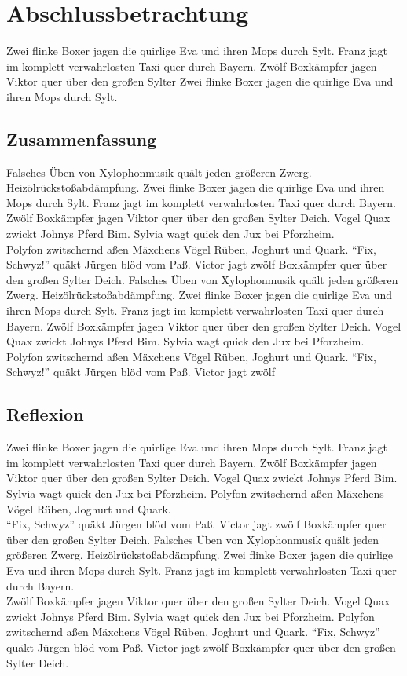 \section{Abschlussbetrachtung}

Zwei flinke Boxer jagen die quirlige Eva und ihren Mops durch Sylt. Franz jagt im komplett verwahrlosten Taxi quer durch Bayern. Zwölf Boxkämpfer jagen Viktor quer über den großen Sylter Zwei flinke Boxer jagen die quirlige Eva und ihren Mops durch Sylt.

\subsection{Zusammenfassung}

Falsches Üben von Xylophonmusik quält jeden größeren Zwerg. Heizölrückstoßabdämpfung. Zwei flinke Boxer jagen die quirlige Eva und ihren Mops durch Sylt. Franz jagt im komplett verwahrlosten Taxi quer durch Bayern. Zwölf Boxkämpfer jagen Viktor quer über den großen Sylter Deich. Vogel Quax zwickt Johnys Pferd Bim. Sylvia wagt quick den Jux bei Pforzheim.\\
Polyfon zwitschernd aßen Mäxchens Vögel Rüben, Joghurt und Quark. "`Fix, Schwyz!"' quäkt Jürgen blöd vom Paß. Victor jagt zwölf Boxkämpfer quer über den großen Sylter Deich. Falsches Üben von Xylophonmusik quält jeden größeren Zwerg. Heizölrückstoßabdämpfung. Zwei flinke Boxer jagen die quirlige Eva und ihren Mops durch Sylt. Franz jagt im komplett verwahrlosten Taxi quer durch Bayern. Zwölf Boxkämpfer jagen Viktor quer über den großen Sylter Deich. Vogel Quax zwickt Johnys Pferd Bim. Sylvia wagt quick den Jux bei Pforzheim. Polyfon zwitschernd aßen Mäxchens Vögel Rüben, Joghurt und Quark. "`Fix, Schwyz!"' quäkt Jürgen blöd vom Paß. Victor jagt zwölf\\

\subsection{Reflexion}

Zwei flinke Boxer jagen die quirlige Eva und ihren Mops durch Sylt. Franz jagt im komplett verwahrlosten Taxi quer durch Bayern. Zwölf Boxkämpfer jagen Viktor quer über den großen Sylter Deich. Vogel Quax zwickt Johnys Pferd Bim. Sylvia wagt quick den Jux bei Pforzheim. Polyfon zwitschernd aßen Mäxchens Vögel Rüben, Joghurt und Quark.\\
"`Fix, Schwyz"' quäkt Jürgen blöd vom Paß. Victor jagt zwölf Boxkämpfer quer über den großen Sylter Deich. Falsches Üben von Xylophonmusik quält jeden größeren Zwerg. Heizölrückstoßabdämpfung. Zwei flinke Boxer jagen die quirlige Eva und ihren Mops durch Sylt. Franz jagt im komplett verwahrlosten Taxi quer durch Bayern.\\
Zwölf Boxkämpfer jagen Viktor quer über den großen Sylter Deich. Vogel Quax zwickt Johnys Pferd Bim. Sylvia wagt quick den Jux bei Pforzheim. Polyfon zwitschernd aßen Mäxchens Vögel Rüben, Joghurt und Quark. "`Fix, Schwyz"' quäkt Jürgen blöd vom Paß. Victor jagt zwölf Boxkämpfer quer über den großen Sylter Deich.\\

